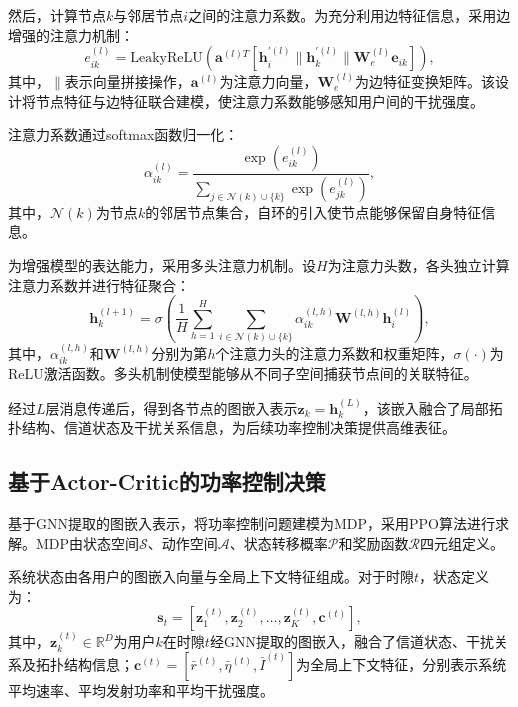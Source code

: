 然后，计算节点$k$与邻居节点$i$之间的注意力系数。为充分利用边特征信息，采用边增强的注意力机制：
\begin{equation}
e_{ik}^{(l)} = \text{LeakyReLU}\left(\mathbf{a}^{(l)T}\left[\mathbf{h}_{i}^{\prime(l)} \| \mathbf{h}_{k}^{\prime(l)} \| \mathbf{W}_{e}^{(l)}\mathbf{e}_{ik}\right]\right),
\end{equation}
其中，$\|$表示向量拼接操作，$\mathbf{a}^{(l)}$为注意力向量，$\mathbf{W}_{e}^{(l)}$为边特征变换矩阵。该设计将节点特征与边特征联合建模，使注意力系数能够感知用户间的干扰强度。

注意力系数通过softmax函数归一化：
\begin{equation}
\alpha_{ik}^{(l)} = \frac{\exp(e_{ik}^{(l)})}{\sum_{j \in \mathcal{N}(k) \cup \{k\}}\exp(e_{jk}^{(l)})},
\end{equation}
其中，$\mathcal{N}(k)$为节点$k$的邻居节点集合，自环的引入使节点能够保留自身特征信息。

为增强模型的表达能力，采用多头注意力机制。设$H$为注意力头数，各头独立计算注意力系数并进行特征聚合：
\begin{equation}
\mathbf{h}_{k}^{(l+1)} = \sigma\left(\frac{1}{H}\sum_{h=1}^{H}\sum_{i \in \mathcal{N}(k) \cup \{k\}} \alpha_{ik}^{(l,h)} \mathbf{W}^{(l,h)}\mathbf{h}_{i}^{(l)}\right),
\end{equation}
其中，$\alpha_{ik}^{(l,h)}$和$\mathbf{W}^{(l,h)}$分别为第$h$个注意力头的注意力系数和权重矩阵，$\sigma(\cdot)$为ReLU激活函数。多头机制使模型能够从不同子空间捕获节点间的关联特征。

经过$L$层消息传递后，得到各节点的图嵌入表示$\mathbf{z}_{k} = \mathbf{h}_{k}^{(L)}$，该嵌入融合了局部拓扑结构、信道状态及干扰关系信息，为后续功率控制决策提供高维表征。

\subsection{基于Actor-Critic的功率控制决策}
基于GNN提取的图嵌入表示，将功率控制问题建模为MDP，采用PPO算法进行求解。MDP由状态空间$\mathcal{S}$、动作空间$\mathcal{A}$、状态转移概率$\mathcal{P}$和奖励函数$\mathcal{R}$四元组定义。

系统状态由各用户的图嵌入向量与全局上下文特征组成。对于时隙$t$，状态定义为：
\begin{equation}
\mathbf{s}_{t} = \left[\mathbf{z}_{1}^{(t)}, \mathbf{z}_{2}^{(t)}, \ldots, \mathbf{z}_{K}^{(t)}, \mathbf{c}^{(t)}\right],
\end{equation}
其中，$\mathbf{z}_{k}^{(t)} \in \mathbb{R}^{D}$为用户$k$在时隙$t$经GNN提取的图嵌入，融合了信道状态、干扰关系及拓扑结构信息；$\mathbf{c}^{(t)} = \left[\bar{r}^{(t)}, \bar{\eta}^{(t)}, \bar{I}^{(t)}\right]$为全局上下文特征，分别表示系统平均速率、平均发射功率和平均干扰强度。

